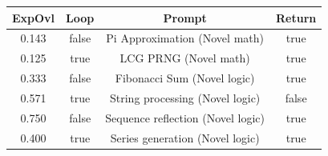 \begin{table}[h]
\centering
\begin{tabular}{ |c|c|c|c| }
\hline
ExpOvl & Loop & Prompt & Return \\
\hline
0.143 & false & Pi Approximation (Novel math) & true \\
\hline
0.125 & true & LCG PRNG (Novel math) & true \\
\hline
0.333 & false & Fibonacci Sum (Novel logic) & true \\
\hline
0.571 & true & String processing (Novel logic) & false \\
\hline
0.750 & false & Sequence reflection (Novel logic) & true \\
\hline
0.400 & true & Series generation (Novel logic) & true \\
\hline
\end{tabular}
\end{table}
